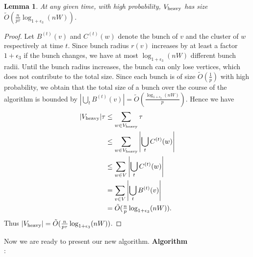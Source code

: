 \documentclass[11pt]{article}
\newtheorem{lemma}[theorem]{Lemma}
\theoremstyle{definition}
\theoremstyle{remark}
\begin{document}
\begin{titlepage}
\begin{lemma}\label{lm:size_heavy_moved}
 At any given time, with high probability, $ V_{\rm{heavy}} $ has size $\tilde O (\tfrac{n }{p\tau}\log_{1+\epsilon_3}(nW)) $.\label{lm:size_H}
\end{lemma}
\begin{proof}
    Let $B^{(t)}(v)$ and $C^{(t)}(w)$ denote the bunch of $v$  and the cluster of $w$ respectively at time $t$. Since bunch radius $r(v)$ increases by at least a factor $1+\epsilon_3$ if the bunch changes, we have at most $\log_{1+\epsilon_3}(nW)$ different bunch radii. Until the bunch radius increases, the bunch can only lose vertices, which does not contribute to the total size. Since each bunch is of size $\tilde{O}(\tfrac{1}{p})$ with high probability, we obtain that the total size of a bunch over the course of the algorithm is bounded by $\left|\bigcup_{t} B^{(t)}(v)\right|=\tilde{O}\left(\tfrac{\log_{1+\epsilon_3}(nW)}{p}\right)$. Hence we have 
    \begin{align*}
        |V_{\rm{heavy}}|\tau &\leq \sum_{w\in V_{\rm{heavy}}} \tau \\
        &\leq \sum_{w\in V_{\rm{heavy}}} \left| \bigcup_t C^{(t)}(w) \right| \\
        &\leq \sum_{w\in V} \left| \bigcup_t C^{(t)}(w) \right| \\
        &= \sum_{v\in V} \left| \bigcup_t B^{(t)}(v) \right| \\
        &= \tilde O ( \tfrac{n}{p}\log_{1+\epsilon_3}(nW)).
    \end{align*}
    Thus $|V_{\rm{heavy}}| = \tilde O (\tfrac{n }{p\tau}\log_{1+\epsilon_3}(nW))$.\qedhere
\end{proof}

Now we are ready to present our new algorithm. 
\textbf{Algorithm} \\
\Initialization{}:


\end{titlepage}
\end{document}
